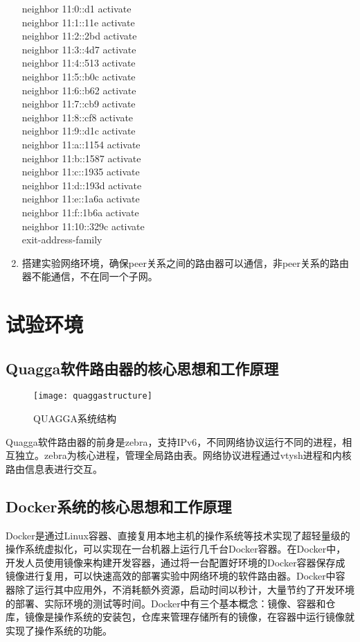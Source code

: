 \begin{enumerate}
     neighbor 11:0::d1  activate\\
     neighbor 11:1::11e  activate\\
     neighbor 11:2::2bd  activate\\
     neighbor 11:3::4d7  activate\\
     neighbor 11:4::513  activate\\
     neighbor 11:5::b0c  activate\\
     neighbor 11:6::b62  activate\\
     neighbor 11:7::cb9  activate\\
     neighbor 11:8::cf8  activate\\
     neighbor 11:9::d1c  activate\\
     neighbor 11:a::1154  activate\\
     neighbor 11:b::1587  activate\\
     neighbor 11:c::1935  activate\\
     neighbor 11:d::193d  activate\\
     neighbor 11:e::1a6a  activate\\
     neighbor 11:f::1b6a  activate\\
     neighbor 11:10::329c  activate\\
     exit-address-family
\item  搭建实验网络环境，确保peer关系之间的路由器可以通信，非peer关系的路由器不能通信，不在同一个子网。
\end{enumerate}

\section{试验环境}
\subsection{Quagga软件路由器的核心思想和工作原理}

\begin{figure}
  \centering
  \texttt{[image: quaggastructure]}\\
  \caption{QUAGGA系统结构}\label{fig:quaggastructure}
\end{figure}

Quagga\cite{quagga}软件路由器的前身是zebra，支持IPv6，不同网络协议运行不同的进程，相互独立。zebra为核心进程，管理全局路由表。网络协议进程通过vtysh进程和内核路由信息表进行交互。

\subsection{Docker系统的核心思想和工作原理}
Docker\cite{docker}是通过Linux容器、直接复用本地主机的操作系统等技术实现了超轻量级的操作系统虚拟化，可以实现在一台机器上运行几千台Docker容器。在Docker中，开发人员使用镜像来构建开发容器，通过将一台配置好环境的Docker容器保存成镜像进行复用，可以快速高效的部署实验中网络环境的软件路由器。Docker中容器除了运行其中应用外，不消耗额外资源，启动时间以秒计，大量节约了开发环境的部署、实际环境的测试等时间。Docker中有三个基本概念：镜像、容器和仓库，镜像是操作系统的安装包，仓库来管理存储所有的镜像，在容器中运行镜像就实现了操作系统的功能。

